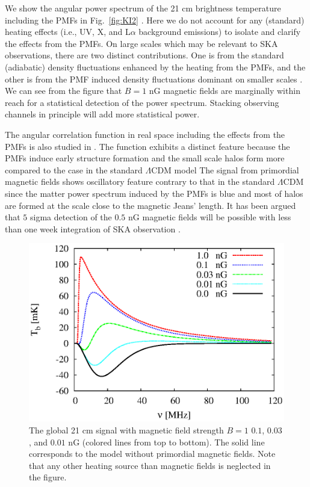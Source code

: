 \documentclass{PoS}
\begin{document}
We show the angular power spectrum of the 21 cm brightness temperature
including the PMFs in Fig.~\ref{fig:KI2}
\cite{2014arXiv1403.2608S}. Here we do not account for any (standard)
heating effects (i.e., UV, X, and L$\alpha$ background emissions) to isolate and
clarify the effects from the PMFs.  On large scales which may be
relevant to SKA 
observations, there are two distinct contributions. One is from the
standard (adiabatic) density fluctuations enhanced by the heating from
the PMFs, and the other is from the PMF induced density fluctuations
dominant on smaller scales
\cite{2006MNRAS.372.1060T,2009ApJ...692..236S}. We can see from the
figure that $B=1$ nG
magnetic fields are marginally within reach for a statistical detection
of the power spectrum. Stacking observing channels in principle will add
more statistical power.

The angular correlation function in real space including the effects
from the PMFs is also studied in \cite{2009JCAP...11..021S}.  The
function exhibits a distinct feature because the PMFs induce early
structure formation and the small scale halos form more compared to the
case in the standard $\Lambda$CDM model The signal from primordial
magnetic fields shows oscillatory feature contrary to that in the
standard $\Lambda$CDM since the matter power spectrum induced by the
PMFs is blue and most of halos are formed at the scale close to the
magnetic Jeans' length. It has been argued that $5$ sigma detection of
the $0.5$ nG magnetic fields will be possible with less than one week
integration of SKA observation \cite{2009JCAP...11..021S}.

\begin{figure}[]
\includegraphics[width=0.6\linewidth,angle=0]{figs/KI_fig1.eps}
\caption{The global 21 cm signal with magnetic field strength $B=1$
$0.1$, $0.03$, and $0.01$ nG (colored lines from top to bottom). The
solid line corresponds to the model without primordial magnetic fields.
Note that any other heating source than magnetic fields is neglected in
the figure.}  \label{fig:KI1}
\end{figure}
\end{document}
